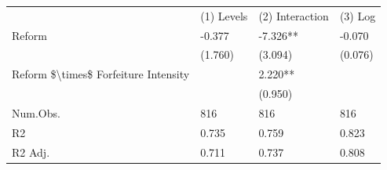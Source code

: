 \begin{tabular}{llll}
& (1) Levels & (2) Interaction & (3) Log \\
Reform & -0.377 & -7.326** & -0.070 \\
& (1.760) & (3.094) & (0.076) \\
Reform \$\textbackslash{}times\$ Forfeiture Intensity &  & 2.220** &  \\
&  & (0.950) &  \\
Num.Obs. & 816 & 816 & 816 \\
R2 & 0.735 & 0.759 & 0.823 \\
R2 Adj. & 0.711 & 0.737 & 0.808 \\
\end{tabular}
